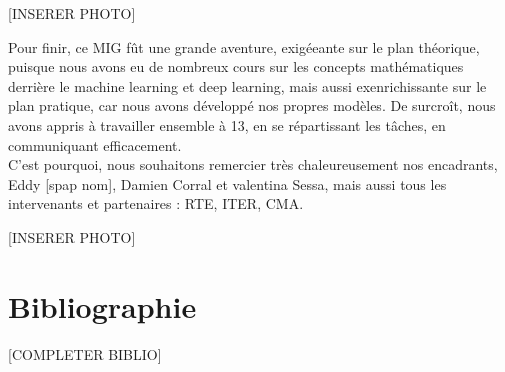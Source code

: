 \documentclass{article}
\theoremstyle{nopointbreak}
\theoremstyle{nobrkbold}
\begin{document}
[INSERER PHOTO]

    Pour finir, ce MIG fût une grande aventure, exigéeante sur le plan théorique, 
puisque nous avons eu de nombreux cours sur les concepts mathématiques derrière 
le machine learning et deep learning, mais aussi exenrichissante sur le plan pratique,
car nous avons développé nos propres modèles. De surcroît, nous avons appris à travailler
ensemble à 13, en se répartissant les tâches, en communiquant efficacement.\\

    C'est pourquoi, nous souhaitons remercier très chaleureusement nos encadrants, Eddy [spap nom],
Damien Corral et valentina Sessa, mais aussi tous les intervenants et partenaires : RTE, ITER, CMA. 

[INSERER PHOTO]

\section{Bibliographie}
[COMPLETER BIBLIO]
\end{document}
